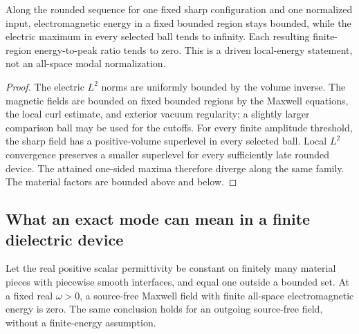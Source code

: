 \begin{corollary}
\label{hs:three-regional-volume}
Along the rounded sequence for one fixed sharp configuration and
one normalized input, electromagnetic energy in a fixed bounded
region stays bounded, while the electric maximum in every selected
ball tends to infinity.  Each resulting finite-region energy-to-peak
ratio tends to zero.  This is a driven local-energy statement, not
an all-space modal normalization.
\end{corollary}

\begin{proof}
The electric $L^2$ norms are uniformly bounded by the volume inverse.
The magnetic fields are bounded on fixed bounded regions by the
Maxwell equations, the local curl estimate, and exterior vacuum
regularity; a slightly larger comparison ball may be used for the
cutoffs.  For every finite amplitude threshold, the sharp field has a
positive-volume superlevel in every selected ball.  Local $L^2$
convergence preserves a smaller superlevel for every sufficiently late
rounded device.  The attained one-sided maxima therefore diverge
along the same family.  The material factors are bounded above and below.
\end{proof}

\subsection{What an exact mode can mean in a finite dielectric device}
\label{hs:three-modal-subsection}

\begin{proposition}
\label{hs:three-no-real-mode}
Let the real positive scalar permittivity be constant on finitely
many material pieces with piecewise smooth interfaces, and equal
one outside a bounded set.  At a fixed real $\omega>0$, a source-free
Maxwell field with finite all-space electromagnetic energy is zero.
The same conclusion holds for an outgoing source-free field,
without a finite-energy assumption.
\end{proposition}

